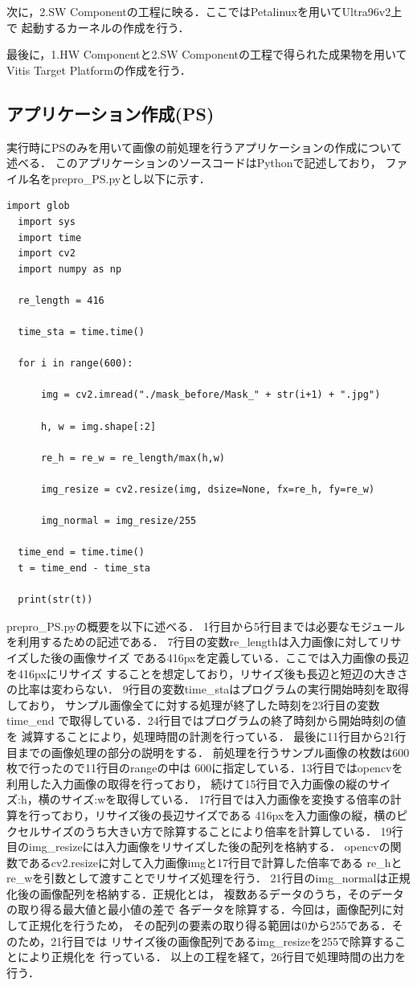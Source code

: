 \documentclass[11pt,a4j]{jreport}
\begin{document}
 次に，2.SW Componentの工程に映る．ここではPetalinuxを用いてUltra96v2上で
 起動するカーネルの作成を行う．

 最後に，1.HW Componentと2.SW Componentの工程で得られた成果物を用いて
 Vitis Target Platformの作成を行う．
 \subsection{アプリケーション作成(PS)}
実行時にPSのみを用いて画像の前処理を行うアプリケーションの作成について述べる．
このアプリケーションのソースコードはPythonで記述しており，
ファイル名をprepro_PS.pyとし以下に示す．
\begin{lstlisting}[caption=prepro_PS.py]
  import glob
  import sys
  import time
  import cv2
  import numpy as np
  
  re_length = 416
  
  time_sta = time.time()
  
  for i in range(600):
  
      img = cv2.imread("./mask_before/Mask_" + str(i+1) + ".jpg")
  
      h, w = img.shape[:2]
  
      re_h = re_w = re_length/max(h,w)
  
      img_resize = cv2.resize(img, dsize=None, fx=re_h, fy=re_w)
  
      img_normal = img_resize/255
  
  time_end = time.time()
  t = time_end - time_sta
  
  print(str(t))
\end{lstlisting}
prepro_PS.pyの概要を以下に述べる．
1行目から5行目までは必要なモジュールを利用するための記述である．
7行目の変数re_lengthは入力画像に対してリサイズした後の画像サイズ
である416pxを定義している．ここでは入力画像の長辺を416pxにリサイズ
することを想定しており，リサイズ後も長辺と短辺の大きさの比率は変わらない．
9行目の変数time_staはプログラムの実行開始時刻を取得しており，
サンプル画像全てに対する処理が終了した時刻を23行目の変数time_end
で取得している．24行目ではプログラムの終了時刻から開始時刻の値を
減算することにより，処理時間の計測を行っている．
最後に11行目から21行目までの画像処理の部分の説明をする．
前処理を行うサンプル画像の枚数は600枚で行ったので11行目のrangeの中は
600に指定している．13行目ではopencvを利用した入力画像の取得を行っており，
続けて15行目で入力画像の縦のサイズ:h，横のサイズ:wを取得している．
17行目では入力画像を変換する倍率の計算を行っており，リサイズ後の長辺サイズである
416pxを入力画像の縦，横のピクセルサイズのうち大きい方で除算することにより倍率を計算している．
19行目のimg_resizeには入力画像をリサイズした後の配列を格納する．
opencvの関数であるcv2.resizeに対して入力画像imgと17行目で計算した倍率である
re_hとre_wを引数として渡すことでリサイズ処理を行う．
21行目のimg_normalは正規化後の画像配列を格納する．正規化とは，
複数あるデータのうち，そのデータの取り得る最大値と最小値の差で
各データを除算する．今回は，画像配列に対して正規化を行うため，
その配列の要素の取り得る範囲は0から255である．そのため，21行目では
リサイズ後の画像配列であるimg_resizeを255で除算することにより正規化を
行っている．
以上の工程を経て，26行目で処理時間の出力を行う．
\end{document}
